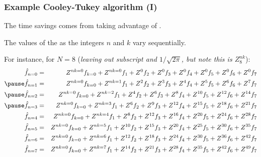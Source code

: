\documentclass[hyperref={colorlinks=true}]{beamer}
\begin{document}
\begin{frame}%
  \frametitle{Example Cooley-Tukey algorithm (I)}
  
  The time savings comes from taking advantage of . 
  
  \mysp
  
  The values of the  as the integers $n$ and $k$ vary sequentially. 
  
  \mysp
  
  For instance, for $N = 8$ 
  {\footnotesize (\textit{leaving out subscript and $1/\sqrt{2\pi}$, but note this is $Z_8^{nk}$})}: \pause
  \begin{eqnarray}
    \hat{f}_{n=0} &=& Z^{nk=0} f_{k=0} + Z^{nk=0} f_{1} + Z^{0} f_{2} + Z^{0} f_{3} + Z^{0} f_{4} + Z^{0} f_{5} + Z^{0} f_{6} + Z^{0} f_{7} \nonumber \\ \pause
    \hat{f}_{n=1} &=& Z^{nk=0} f_{k=0} + Z^{nk=1} f_{1} + Z^{2} f_{2} + Z^{3} f_{3} + Z^{4} f_{4} + Z^{5} f_{5} + Z^{6} f_{6} + Z^{7} f_{7} \nonumber\\ \pause
    \hat{f}_{n=2} &=& Z^{nk=0} f_{k=0} + Z^{nk=2} f_{1} + Z^{4} f_{2} + Z^{6} f_{3} + Z^{8} f_{4} + Z^{10} f_{5} + Z^{12} f_{6} + Z^{14} f_{7} \nonumber \\ \pause
    \hat{f}_{n=3} &=& Z^{nk=0} f_{k=0} + Z^{nk=3} f_{1} + Z^{6} f_{2} + Z^{9} f_{3} + Z^{12} f_{4} + Z^{15} f_{5} + Z^{18} f_{6} + Z^{21} f_{7} \nonumber \\ 
    \hat{f}_{n=4} &=& Z^{nk=0} f_{k=0} + Z^{nk=4} f_{1} + Z^{8} f_{2} + Z^{12} f_{3} + Z^{16} f_{4} + Z^{20} f_{5} + Z^{24} f_{6} + Z^{28} f_{7} \nonumber \\
    \hat{f}_{n=5} &=& Z^{nk=0} f_{k=0} + Z^{nk=5} f_{1} + Z^{10} f_{2} + Z^{15} f_{3} + Z^{20} f_{4} + Z^{25} f_{5} + Z^{30} f_{6} + Z^{35} f_{7} \nonumber \\
    \hat{f}_{n=6} &=& Z^{nk=0} f_{k=0} + Z^{nk=6} f_{1} + Z^{12} f_{2} + Z^{18} f_{3} + Z^{24} f_{4} + Z^{30} f_{5} + Z^{36} f_{6} + Z^{42} f_{7} \nonumber \\
    \hat{f}_{n=7} &=& Z^{nk=0} f_{k=0} + Z^{nk=7} f_{1} + Z^{14} f_{2} + Z^{21} f_{3} + Z^{28} f_{4} + Z^{35} f_{5} + Z^{42} f_{6} + Z^{49} f_{7} \nonumber
  \end{eqnarray}

\end{frame}

\end{document}

